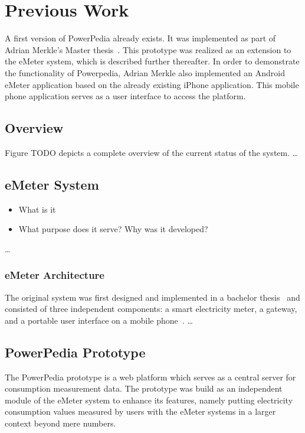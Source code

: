 \section{Previous Work} \label{sec:previous_work}
A first version of PowerPedia already exists. It was implemented as part of Adrian Merkle's Master thesis~\cite{merklepp}. This prototype was realized as an extension to the eMeter system, which is described further thereafter.
In order to demonstrate the functionality of Powerpedia, Adrian Merkle also implemented an Android eMeter application based on the already existing iPhone application. This mobile phone application serves as a user interface to access the platform.

\subsection{Overview}

Figure TODO depicts a complete overview of the current status of the system. 
\dots

\subsection{eMeter System}
\begin{itemize}
 \item What is it
 \item What purpose does it serve? Why was it developed?
\end{itemize}

\dots
\subsubsection{eMeter Architecture}\label{sec:emeter_architecture}
The original system was first designed and implemented in a bachelor thesis~\cite{roediger} and consisted of three independent components: a smart electricity meter, a gateway, and a portable user interface on a mobile phone~\cite{weissm:inprocMUM:2009}. 
\dots




\subsection{PowerPedia Prototype}
The PowerPedia prototype is a web platform which serves as a central server for consumption measurement data. The prototype was build as an independent module of the eMeter system to enhance its features, namely putting electricity consumption values measured by users with the eMeter systems in a larger context beyond mere numbers.

